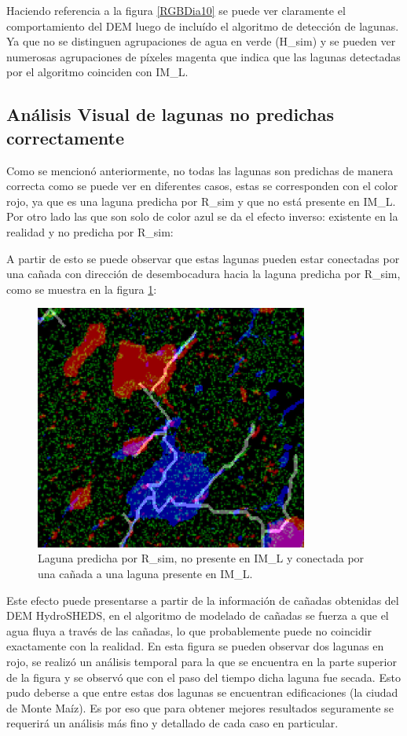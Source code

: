 \documentclass[10pt,a4paper, twoside]{report}
\begin{document}
Haciendo referencia a la figura \ref{RGBDia10} se puede ver claramente el comportamiento del DEM luego de incluído el algoritmo de detección de lagunas. Ya que no se distinguen agrupaciones de agua en verde (H\_sim) y se pueden ver numerosas agrupaciones de píxeles magenta que indica que las lagunas detectadas por el algoritmo coinciden con IM\_L.

\subsection{Análisis Visual de lagunas no predichas correctamente}
\label{obscorreccionlagunas}
Como se mencionó anteriormente, no todas las lagunas son predichas de manera correcta como se puede ver en diferentes casos, estas se corresponden con el color rojo, ya que es una laguna predicha por R\_sim y que no está presente en IM\_L. Por otro lado las que son solo de color azul se da el efecto inverso: existente en la realidad y no predicha por R\_sim:

A partir de esto se puede observar que estas lagunas pueden estar conectadas por una cañada con dirección de desembocadura hacia la laguna predicha por R\_sim, como se muestra en la figura \ref{LagunaProblema1}: 

\begin{figure}[!htb]
   \centering      
   \includegraphics[width=0.8\textwidth]{imagenes/LagunaProblema1.jpg}
 \caption{Laguna predicha por R\_sim, no presente en IM\_L y conectada por una cañada a una laguna presente en IM\_L.}
 \label{LagunaProblema1}
\end{figure}

Este efecto puede presentarse a partir de la información de cañadas obtenidas del DEM HydroSHEDS, en el algoritmo de modelado de cañadas se fuerza a que el agua fluya a través de las cañadas, lo que probablemente puede no coincidir exactamente con la realidad. En esta figura se pueden observar dos lagunas en rojo, se realizó un análisis temporal para la que se encuentra en la parte superior de la figura y se observó que con el paso del tiempo dicha laguna fue secada. Esto pudo deberse a que entre estas dos lagunas se encuentran edificaciones (la ciudad de Monte Maíz). Es por eso que para obtener mejores resultados seguramente se requerirá un análisis más fino y detallado de cada caso en particular.
\end{document}

